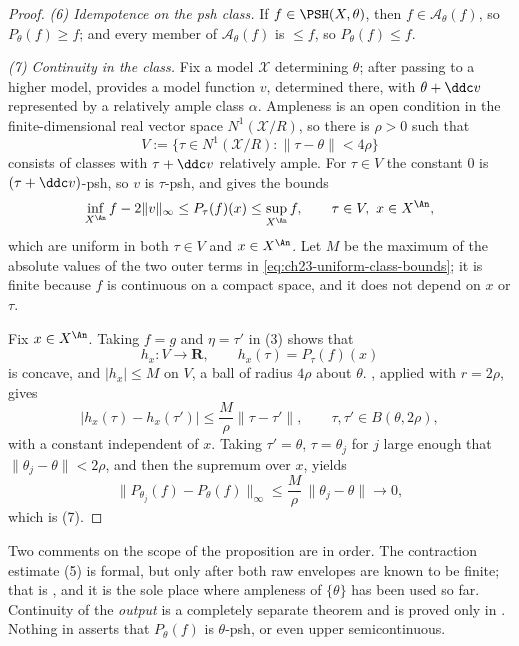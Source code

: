 \begin{proof}
\emph{(6) Idempotence on the psh class.}  If \(f\in\PSH(X,\theta)\), then
\(f\in\mathcal A_\theta(f)\), so \(P_\theta(f)\geq f\); and every member of
\(\mathcal A_\theta(f)\) is \(\leq f\), so \(P_\theta(f)\leq f\).

\emph{(7) Continuity in the class.}  Fix a model \(\mathcal X\) determining
\(\theta\); after passing to a higher model,
 provides a model function \(v\),
determined there, with \(\theta+\ddc v\) represented by a relatively ample
class \(\alpha\).  Ampleness is an open condition in the finite-dimensional
real vector space \(N^1(\mathcal X/R)\), so there is \(\rho>0\) such that
\[
 V:=\{\tau\in N^1(\mathcal X/R):\|\tau-\theta\|<4\rho\}
\]
consists of classes with \(\tau+\ddc v\) relatively ample.  For
\(\tau\in V\) the constant \(0\) is \((\tau+\ddc v)\)-psh, so \(v\) is
\(\tau\)-psh, and  gives the bounds
\begin{equation}\label{eq:ch23-uniform-class-bounds}
       \inf_{X^{\An}} f-2\|v\|_\infty
       \leq P_\tau(f)(x)\leq\sup_{X^{\An}} f,
       \qquad \tau\in V,\ x\in X^{\An},
\end{equation}
which are uniform in both \(\tau\in V\) and \(x\in X^{\An}\).  Let \(M\) be
the maximum of the absolute values of the two outer terms in
\eqref{eq:ch23-uniform-class-bounds}; it is finite because \(f\) is
continuous on a compact space, and it does not depend on \(x\) or \(\tau\).

Fix \(x\in X^{\An}\).  Taking \(f=g\) and \(\eta=\tau'\) in (3) shows that
\[
 h_x:V\longrightarrow\mathbf R,
 \qquad h_x(\tau)=P_\tau(f)(x)
\]
is concave, and \(|h_x|\leq M\) on \(V\), a ball of radius \(4\rho\)
about \(\theta\).  , applied with
\(r=2\rho\), gives
\[
 |h_x(\tau)-h_x(\tau')|\leq\frac{M}{\rho}\|\tau-\tau'\|,
 \qquad\tau,\tau'\in B(\theta,2\rho),
\]
with a constant independent of \(x\).  Taking \(\tau'=\theta\), \(\tau=\theta_j\)
for \(j\) large enough that \(\|\theta_j-\theta\|<2\rho\), and then the
supremum over \(x\), yields
\[
       \|P_{\theta_j}(f)-P_\theta(f)\|_\infty
       \leq \frac{M}{\rho}\,\|\theta_j-\theta\|\longrightarrow0 ,
\]
which is (7).
\end{proof}

Two comments on the scope of the proposition are in order.  The contraction
estimate (5) is formal, but only after both raw envelopes are known to be
finite; that is , and it is the sole place
where ampleness of \(\{\theta\}\) has been used so far.  Continuity of the
\emph{output} is a completely separate theorem and is proved only in
.  Nothing in
 asserts that \(P_\theta(f)\) is
\(\theta\)-psh, or even upper semicontinuous.

